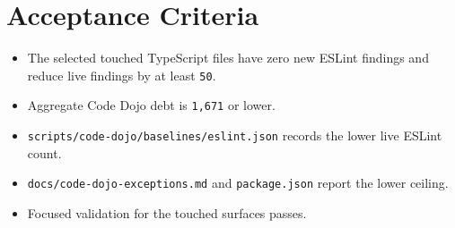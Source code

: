 \section{Acceptance Criteria}\label{record-223-acceptance-criteria}

\begin{itemize}
\tightlist
\item
  The selected touched TypeScript files have zero new ESLint findings and reduce live findings by at least \texttt{5\allowbreak{}0}.
\item
  Aggregate Code Dojo debt is \texttt{1\allowbreak{},\allowbreak{}6\allowbreak{}7\allowbreak{}1} or lower.
\item
  \texttt{s\allowbreak{}c\allowbreak{}r\allowbreak{}i\allowbreak{}p\allowbreak{}t\allowbreak{}s\allowbreak{}/\allowbreak{}c\allowbreak{}o\allowbreak{}d\allowbreak{}e\allowbreak{}-\allowbreak{}d\allowbreak{}o\allowbreak{}j\allowbreak{}o\allowbreak{}/\allowbreak{}b\allowbreak{}a\allowbreak{}s\allowbreak{}e\allowbreak{}l\allowbreak{}i\allowbreak{}n\allowbreak{}e\allowbreak{}s\allowbreak{}/\allowbreak{}e\allowbreak{}s\allowbreak{}l\allowbreak{}i\allowbreak{}n\allowbreak{}t\allowbreak{}.\allowbreak{}j\allowbreak{}s\allowbreak{}o\allowbreak{}n} records the lower live ESLint count.
\item
  \texttt{d\allowbreak{}o\allowbreak{}c\allowbreak{}s\allowbreak{}/\allowbreak{}c\allowbreak{}o\allowbreak{}d\allowbreak{}e\allowbreak{}-\allowbreak{}d\allowbreak{}o\allowbreak{}j\allowbreak{}o\allowbreak{}-\allowbreak{}e\allowbreak{}x\allowbreak{}c\allowbreak{}e\allowbreak{}p\allowbreak{}t\allowbreak{}i\allowbreak{}o\allowbreak{}n\allowbreak{}s\allowbreak{}.\allowbreak{}m\allowbreak{}d} and \texttt{p\allowbreak{}a\allowbreak{}c\allowbreak{}k\allowbreak{}a\allowbreak{}g\allowbreak{}e\allowbreak{}.\allowbreak{}j\allowbreak{}s\allowbreak{}o\allowbreak{}n} report the lower ceiling.
\item
  Focused validation for the touched surfaces passes.
\end{itemize}

